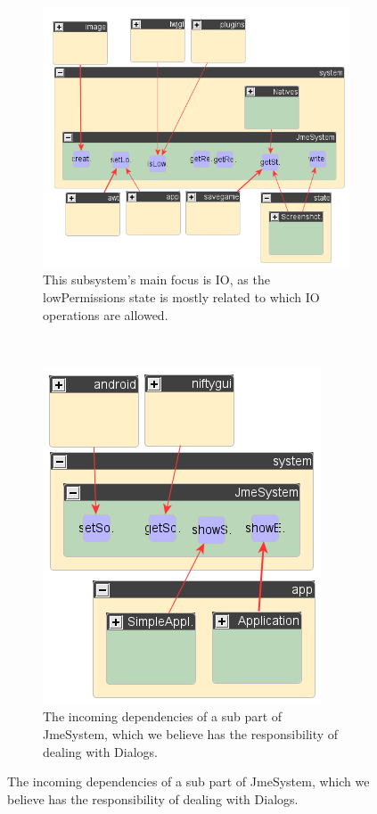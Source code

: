 \documentclass[a4paper, 10pt]{article}
\begin{document}
\begin{figure}
\begin{subfigure}[b]{0.6\textwidth}
\includegraphics[width=\textwidth]{figures/jme-system-io-part.png}
\caption{This subsystem's main focus is IO, as the lowPermissions state is mostly related to which IO operations are allowed.}
\label{fig:system-io-incoming}
\end{subfigure}
~
\begin{subfigure}[b]{0.4\textwidth}
\includegraphics[width=\textwidth]{figures/jme-system-dialog-part.png}
\caption{The incoming dependencies of a sub part of JmeSystem, which we believe has the responsibility of dealing with Dialogs.}
\label{fig:system-dialog-incoming}
\end{subfigure}


\end{figure}
\end{document}

